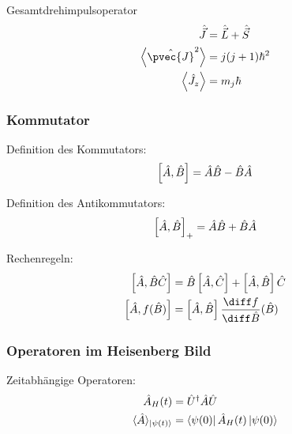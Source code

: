 \documentclass[11pt]{article}
\numberwithin{equation}{section}
\begin{document}
			\noindent
			Gesamtdrehimpulsoperator
			\begin{equation}
				\begin{aligned}
					\hat{\vec{J}} &= \hat{\vec{L}} + \hat{\vec{S}} \\
					\left< \hat{\pvec{J}}^2 \right> &= j(j+1)\hbar^2 \\
					\left< \hat{J}_z \right> &= m_j\hbar \\
				\end{aligned}
			\end{equation}

			\subsubsection{Kommutator}
				\noindent
				Definition des Kommutators:
				\begin{equation}
					\left[\hat{A},\hat{B}\right] = \hat{A}\hat{B} - \hat{B}\hat{A}
				\end{equation}

				\noindent
				Definition des Antikommutators:
				\begin{equation}
					\left[\hat{A},\hat{B}\right]_{+} = \hat{A}\hat{B} + \hat{B}\hat{A}
				\end{equation}

				\noindent
				Rechenregeln:
				\begin{equation}
					\begin{aligned}
						\com{\hat{A}}{\hat{B}\hat{C}}
						&= \hat{B}\com{\hat{A}}{\hat{C}} + \com{\hat{A}}{\hat{B}}\hat{C} \\
						\com{\hat{A}}{f(\hat{B})}
						&= \com{\hat{A}}{\hat{B}}\tder{f}{\hat{B}}(\hat{B})
					\end{aligned}
				\end{equation}

			\subsubsection{Operatoren im Heisenberg Bild}
				\noindent
				Zeitabhängige Operatoren:
				\begin{equation}
					\begin{aligned}
						\hat{A}_H(t) &= \hat{U}^\dagger \hat{A} \hat{U} \\
						\langle \hat{A} \rangle_{\Ket{\psi(t)}} &= \Bra{\psi(0)}\hat{A}_H(t)\Ket{\psi(0)}
					\end{aligned}
				\end{equation}
\end{document}
